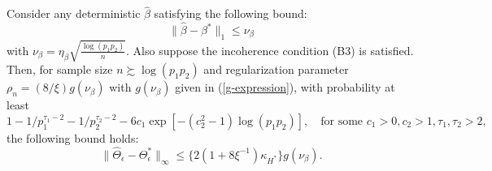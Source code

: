 \begin{corollary} \label{cor:erorrboundTheta}
Consider any deterministic $\widehat{\beta}$ satisfying the following bound:
\begin{equation*}
\|\widehat{\beta} - \beta^*\|_1\leq \nu_\beta
\end{equation*}
with $\nu_\beta = \eta_\beta\sqrt{\frac{\log (p_1p_2)}{n}}$. Also suppose the incoherence condition (B3) is satisfied. Then, for sample size $n \succsim \log(p_1p_2) $  and regularization parameter $\rho_n=(8/\xi)g(\nu_\beta)$ with $g(\nu_\beta)$ given in (\ref{g-expression}), with probability at least
\begin{equation*}
1-1/p_1^{\tau_1-2}-1/p_2^{\tau_2-2}-6c_1\exp[-(c_2^2-1)\log (p_1p_2)], \quad \text{for some }c_1>0,c_2>1,\tau_1,\tau_2>2,
\end{equation*}
the following bound holds:
\begin{equation*}
\|\widehat{\Theta}_\epsilon-\Theta^*_\epsilon\|_\infty \leq \{2(1+8\xi^{-1})\kappa_{H^*}\} g(\nu_\beta).
\end{equation*}
\end{corollary}

\iffalse
\begin{proof}[Proof of Corollary~\ref{cor:erorrboundTheta}]
The statement of this corollary directly follows from Theorem~\ref{thm:ErrorBound_Theta} and Proposition~\ref{prop:residual-concentration}. In particular, for random realizations of the sub-Gaussian vectors $X$ and $E$, B2 in Theorem~\ref{thm:ErrorBound_Theta} occurs w.p. at least $1-1/p_2^{\tau-2}-1/p_1^{\tau-2}-c_1\exp[-c_2\log (p_1p_2)]$. 
\end{proof}
\fi